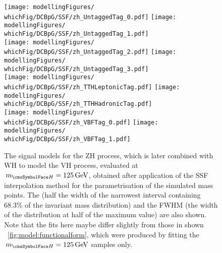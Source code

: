 \begin{figure}[htp!]
\centering
\texttt{[image: modellingFigures/\\whichFig/DCBpG/SSF/zh\_UntaggedTag\_0.pdf]} 
\texttt{[image: modellingFigures/\\whichFig/DCBpG/SSF/zh\_UntaggedTag\_1.pdf]} \\
\texttt{[image: modellingFigures/\\whichFig/DCBpG/SSF/zh\_UntaggedTag\_2.pdf]} 
\texttt{[image: modellingFigures/\\whichFig/DCBpG/SSF/zh\_UntaggedTag\_3.pdf]} \\ 
\texttt{[image: modellingFigures/\\whichFig/DCBpG/SSF/zh\_TTHLeptonicTag.pdf]} 
\texttt{[image: modellingFigures/\\whichFig/DCBpG/SSF/zh\_TTHHadronicTag.pdf]} \\ 
\texttt{[image: modellingFigures/\\whichFig/DCBpG/SSF/zh\_VBFTag\_0.pdf]} 
\texttt{[image: modellingFigures/\\whichFig/DCBpG/SSF/zh\_VBFTag\_1.pdf]} \\

\caption{The signal models for the ZH process, which is later combined with WH to model the VH process, evaluated at $\mH=125\GeV$, obtained after application of the SSF interpolation method for the \DCBpG parametrisation of the simulated mass points. The \effSigma (half the width of the narrowest interval containing 68.3\% of the invariant mass distribution) and the FWHM (the width of the distribution at half of the maximum value) are also shown. Note that the fits here maybe differ slightly from those in shown \Fig~\ref{fig:model:functionalform}, which were produced by fitting the $\mH=125\GeV$ samples only.}

\label{fig:model:sig_model_per_zh}
\end{figure}



